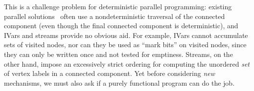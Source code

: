 This is a challenge problem for deterministic parallel programming:
existing parallel solutions~\cite{bfs-pbgl} often use a nondeterministic traversal of the
  connected component
  (even though the final connected component is deterministic),
and IVars and streams provide no obvious aid.  For example, IVars cannot accumulate
sets of visited nodes, nor can they be used as ``mark bits'' on visited nodes, since 
they can only be written once and not tested for emptiness.
Streams, on the other hand, impose an excessively strict ordering
for computing the unordered {\em set} of vertex labels in a
connected component.
Yet before considering {\em new} mechanisms, we must also ask if a purely functional
program can do the job.




